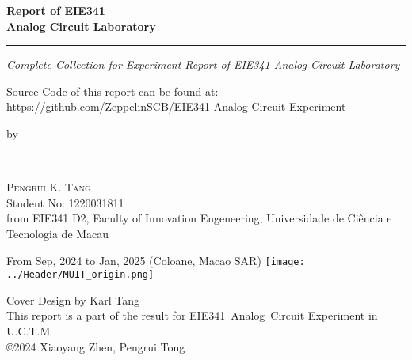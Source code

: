 \begin{titlepage}
    \ActivateWarningFilters[latex]

    \parbox{1\textwidth}{ %
		{\Huge\bfseries Report of EIE341 \\[0.15\baselineskip] 
            Analog Circuit Laboratory}\\[0.15\baselineskip] %
		\rule{1\textwidth}{1pt} %
        {\Large\textit{Complete Collection for Experiment Report of EIE341 Analog Circuit Laboratory}}
        \newline
    }
    \parbox{1\textwidth}{
        \vspace{1\baselineskip}
        \large
        Source Code of this report can be found at:\newline
        \url{https://github.com/ZeppelinSCB/EIE341-Analog-Circuit-Experiment}
        \newline
    }
    \vspace{100pt} %
    \parbox{1\textwidth}{
        {\large by}\\[1.5\baselineskip]
        {\rule[1pt]{200pt}{1pt}} \\[1.25pt]
        {\huge\textsc{Pengrui K. Tang}
            }\\
        {\large{Student No: 1220031811}} \\
        \large from EIE341 D2, \newline
        Faculty of Innovation Engeneering, \newline
        Universidade de Ciência e Tecnologia de Macau
    }
		

    \vspace*{\fill}
		From Sep, 2024 to Jan, 2025 \newline 
        (Coloane, Macao SAR)
        \vspace{0.7\baselineskip}\newline
        \texttt{[image: ../Header/MUIT\_origin.png]}\par
        {\small Cover Design by Karl Tang}\\[0.25pt]
        {\small This report is a part of the result for}
        {\small EIE341~Analog~Circuit Experiment in U.C.T.M}\\[0.25pt]
        {\small \copyright 2024 Xiaoyang Zhen, Pengrui Tong}
\end{titlepage}
